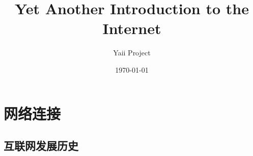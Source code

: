 \documentclass[a4paper]{book}
\begin{document}
\frontmatter



\title{Yet Another Introduction to the Internet}
\author{Yaii Project}
\date{\today}
\maketitle

\mainmatter

\chapter{网络连接}

\section{互联网发展历史}

\appendix

\backmatter
\printindex
\end{document}
